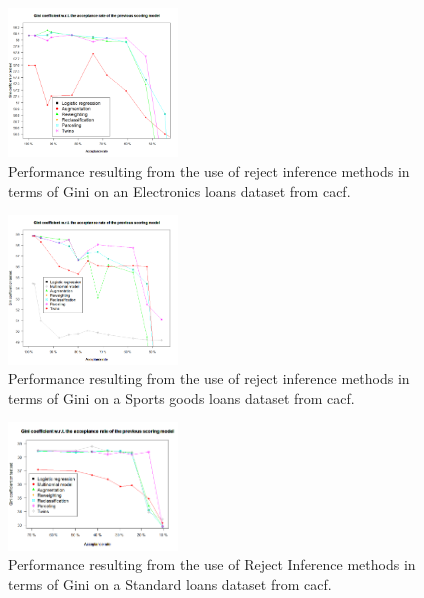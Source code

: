 \begin{figure}[H]
\centering
\includegraphics[width=0.4\textwidth]{figures/appendix/rejectinferencedarty3.png}
\caption{Performance resulting from the use of reject inference methods in terms of Gini on an Electronics loans dataset from \gls{cacf}.}
\label{fig:darty_reject}
\end{figure}

\begin{figure}[H]
\centering
\includegraphics[width=0.4\textwidth]{figures/appendix/rejectinferencedecathlon.png}
\caption{Performance resulting from the use of reject inference methods in terms of Gini on a Sports goods loans dataset from \gls{cacf}.}
\label{fig:decathlon_reject}
\end{figure}

\begin{figure}[H]
\centering
\includegraphics[width=0.4\textwidth]{figures/appendix/rejectinferenceM3.png}
\caption{Performance resulting from the use of Reject Inference methods in terms of Gini on a Standard loans dataset from \gls{cacf}.}
\label{fig:M3_reject}
\end{figure}


